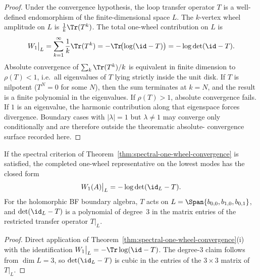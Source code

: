 \begin{proof}
Under the convergence hypothesis, the loop transfer operator $T$ is a well-defined
endomorphism of the finite-dimensional space $L$. The $k$-vertex wheel amplitude on
$L$ is $\frac{1}{k} \Tr(T^k)$. The total
one-wheel contribution on $L$ is
\[
W_1\big|_L = \sum_{k=1}^{\infty} \frac{1}{k} \Tr(T^k)
= -\Tr\!\bigl(\log(\id - T)\bigr)
= -\log\det(\id - T).
\]
Absolute convergence of $\sum_k \Tr(T^k)/k$ is equivalent in finite dimension to
$\rho(T)<1$, i.e.\ all eigenvalues of $T$ lying strictly inside the unit disk.
If $T$ is nilpotent ($T^N = 0$ for some $N$), then the sum terminates at $k = N$,
and the result is a finite polynomial in the eigenvalues. If $\rho(T)>1$, absolute
convergence fails. If $1$ is an eigenvalue, the harmonic contribution along that
eigenspace forces divergence. Boundary cases with $|\lambda|=1$ but $\lambda\neq 1$
may converge only conditionally and are therefore outside the theorematic absolute-
convergence surface recorded here.
\end{proof}

\begin{corollary}
If the spectral criterion of Theorem~\ref{thm:spectral-one-wheel-convergence} is
satisfied, the completed one-wheel representative on the lowest modes has the closed form
\begin{equation}
\label{eq:determinant-formula}
W_1(A)\big|_L = -\log\det(\id_L - T).
\end{equation}
For the holomorphic BF boundary algebra, $T$ acts on $L = \Span\{b_{0,0}, b_{1,0}, b_{0,1}\}$,
and $\det(\id_L - T)$ is a polynomial of degree~$3$ in the matrix entries of the
restricted transfer operator $T|_L$.
\end{corollary}

\begin{proof}
Direct application of Theorem~\ref{thm:spectral-one-wheel-convergence}(i) with the
identification $W_1\big|_L = -\Tr\log(\id - T)$. The degree-$3$ claim follows from
$\dim L = 3$, so $\det(\id_L - T)$ is cubic in the entries of the $3\times 3$
matrix of $T|_L$.
\end{proof}

